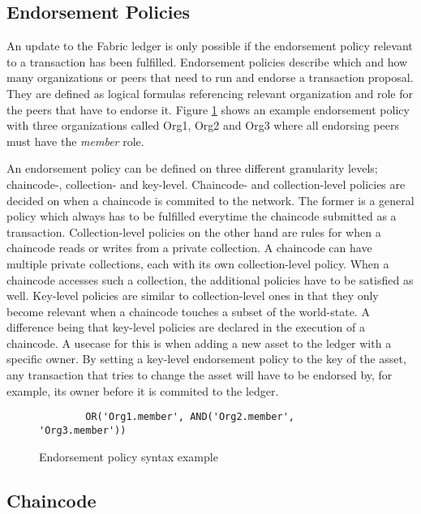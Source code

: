\documentclass[english, biblatex, digitaloutput]{kththesis}
\begin{document}

\subsection{Endorsement Policies}

An update to the Fabric ledger is only possible if the endorsement policy relevant to a transaction has been fulfilled. Endorsement policies describe which and how many organizations or peers that need to run and endorse a transaction proposal. They are defined as logical formulas referencing relevant organization and role for the peers that have to endorse it. Figure \ref{fig:endorsement-policy-example} shows an example endorsement policy with three organizations called Org1, Org2 and Org3 where all endorsing peers must have the \textit{member} role.

An endorsement policy can be defined on three different granularity levels; chaincode-, collection- and key-level. Chaincode- and collection-level policies are decided on when a chaincode is commited to the network. The former is a general policy which always has to be fulfilled everytime the chaincode submitted as a transaction. Collection-level policies on the other hand are rules for when a chaincode reads or writes from a private collection. A chaincode can have multiple private collections, each with its own collection-level policy. When a chaincode accesses such a collection, the additional policies have to be satisfied as well. Key-level policies are similar to collection-level ones in that they only become relevant when a chaincode touches a subset of the world-state. A difference being that key-level policies are declared in the execution of a chaincode. A usecase for this is when adding a new asset to the ledger with a specific owner. By setting a key-level endorsement policy to the key of the asset, any transaction that tries to change the asset will have to be endorsed by, for example, its owner before it is commited to the ledger.

\begin{figure}
	\begin{verbatim}
		OR('Org1.member', AND('Org2.member', 'Org3.member'))
	\end{verbatim}
	\caption{Endorsement policy syntax example}
	\label{fig:endorsement-policy-example}
\end{figure}

\subsection{Chaincode}
\end{document}
